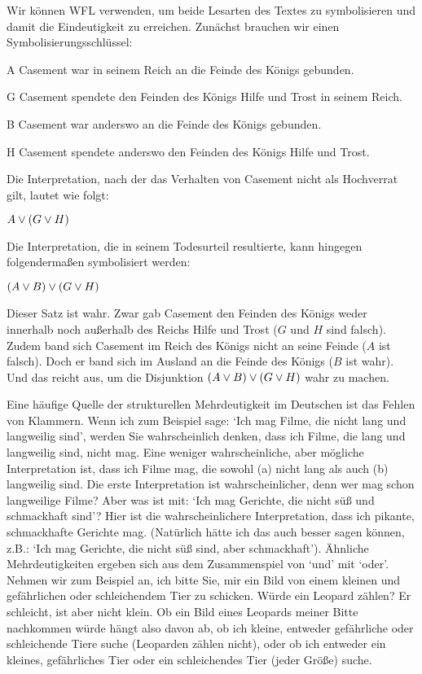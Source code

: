 Wir können WFL verwenden, um beide Lesarten des Textes zu symbolisieren und damit die Eindeutigkeit zu erreichen. Zunächst brauchen wir einen Symbolisierungsschlüssel:
\begin{ekey}
	\item[A] Casement war in seinem Reich an die Feinde des Königs gebunden.
	\item[G] Casement spendete den Feinden des Königs Hilfe und Trost in seinem Reich.
	\item[B] Casement war anderswo an die Feinde des Königs gebunden.
	\item[H] Casement spendete anderswo den Feinden des Königs Hilfe und Trost.
\end{ekey}
Die Interpretation, nach der das Verhalten von Casement nicht als Hochverrat gilt, lautet wie folgt:
\begin{earg}
	\item[] $A \vee (G \vee H)$
\end{earg} 
Die Interpretation, die in seinem Todesurteil resultierte, kann hingegen folgenderma{\ss}en symbolisiert werden:
\begin{earg}
	\item[] $(A \vee B) \vee (G \vee H)$
\end{earg}
Dieser Satz ist wahr. Zwar gab Casement den Feinden des Königs weder innerhalb noch au{\ss}erhalb des Reichs Hilfe und Trost ($G$ und $H$ sind falsch). Zudem band sich Casement im Reich des Königs nicht an seine Feinde ($A$ ist falsch). Doch er band sich im Ausland an die Feinde des Königs ($B$ ist wahr). Und das reicht aus, um die Disjunktion $(A \vee B) \vee (G \vee H)$ wahr zu machen.

Eine häufige Quelle der strukturellen Mehrdeutigkeit im Deutschen ist das Fehlen von Klammern. Wenn ich zum Beispiel sage: `Ich mag Filme, die nicht lang und langweilig sind', werden Sie wahrscheinlich denken, dass ich Filme, die lang und langweilig sind, nicht mag. Eine weniger wahrscheinliche, aber mögliche Interpretation ist, dass ich Filme mag, die sowohl (a) nicht lang als auch (b) langweilig sind. Die erste Interpretation ist wahrscheinlicher, denn wer mag schon langweilige Filme? Aber was ist mit: `Ich mag Gerichte, die nicht sü{\ss} und schmackhaft sind'? Hier ist die wahrscheinlichere Interpretation, dass ich pikante, schmackhafte Gerichte mag. (Natürlich hätte ich das auch besser sagen können, z.B.: `Ich mag Gerichte, die nicht sü{\ss} sind, aber schmackhaft'). Ähnliche Mehrdeutigkeiten ergeben sich aus dem Zusammenspiel von `und' mit `oder'. Nehmen wir zum Beispiel an, ich bitte Sie, mir ein Bild von einem kleinen und gefährlichen oder schleichendem Tier zu schicken.  Würde ein Leopard zählen? Er schleicht, ist aber nicht klein. Ob ein Bild eines Leopards meiner Bitte nachkommen würde hängt also davon ab, ob ich kleine, entweder gefährliche oder schleichende Tiere suche (Leoparden zählen nicht), oder ob ich entweder ein kleines, gefährliches Tier oder ein schleichendes Tier (jeder Grö{\ss}e) suche.

